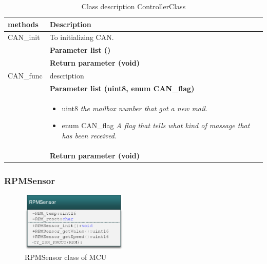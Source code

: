 \begin{table}[H]
	\centering
	\begin{tabular}{|p{5 cm}|p{10 cm}|}
		\hline
		\textbf{methods} & \textbf{Description} \\ \hline
		
		CAN\_init
		& To initializing CAN. 
		\\ & \textbf{Parameter list ()}
		\\ & \textbf{Return parameter (void)}
		\\ \hline
		
		CAN\_func
		& description
		\\ & \textbf{Parameter list (uint8, enum CAN\_flag)}
		\\ & \begin{itemize}
			\item {\large uint8}
			\subitem \textit{the mailbox number that got a new mail.}
			\item {\large enum CAN\_flag}
			\subitem \textit{A flag that tells what kind of massage that has been received.}
		\end{itemize}
		\\ & \textbf{Return parameter (void)}
		\\ \hline
		
		
	\end{tabular}
	\caption{Class description ControllerClass}
	\label{table:Class_description_CAN_MCU}
\end{table}

\subsubsection{RPMSensor}

\begin{figure}[H]
	\centering
	\includegraphics [width=2in]{Software/Pictures/class-diagram-RPMSensor.png}
	\caption{RPMSensor class of MCU}
	\label{fig:Class_diagram_MCU_RPMSensor}
\end{figure}

